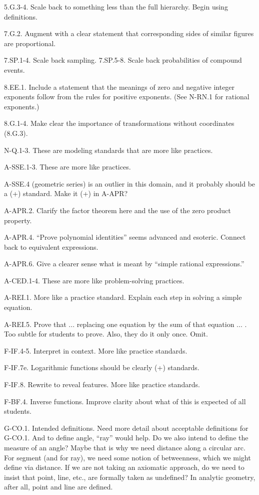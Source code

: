 
5.G.3-4.  Scale back to something less than the full hierarchy.  Begin using definitions. 

7.G.2.  Augment with a clear statement that corresponding sides of similar figures are proportional.  

7.SP.1-4.  Scale back sampling.  
7.SP.5-8.  Scale back probabilities of compound events.  

8.EE.1.  Include a statement that the meanings of zero and negative integer exponents follow from the rules for positive exponents.  (See N-RN.1 for rational exponents.)  

8.G.1-4.  Make clear the importance of transformations without coordinates (8.G.3). 

N-Q.1-3.  These are modeling standards that are more like practices.  

A-SSE.1-3.  These are more like practices.  

A-SSE.4 (geometric series) is an outlier in this domain, and it probably should be a (+) standard.  Make it (+) in A-APR?  

A-APR.2.  Clarify the factor theorem here and the use of the zero product property.  

A-APR.4.  ``Prove polynomial identities'' seems advanced and esoteric.  Connect back to equivalent expressions.  

A-APR.6.  Give a clearer sense what is meant by ``simple rational expressions.''

A-CED.1-4.  These are more like problem-solving practices. 

A-REI.1.  More like a practice standard.  Explain each step in solving a simple equation.  

A-REI.5.  Prove that ... replacing one equation by the sum of that equation ... .   Too subtle for students to prove.  Also, they do it only once.  Omit.  

F-IF.4-5.  Interpret in context.  More like practice standards.  

F-IF.7e.  Logarithmic functions should be clearly (+) standards.  

F-IF.8.  Rewrite to reveal features.  More like practice standards. 

F-BF.4.  Inverse functions.  Improve clarity about what of this is expected of all students.  

G-CO.1.  Intended definitions.  Need more detail about acceptable definitions for G-CO.1.  And to define angle, “ray” would help.  Do we also intend to define the measure of an angle?  Maybe that is why we need distance along a circular arc.  For segment (and for ray), we need some notion of betweenness, which we might define via distance.  If we are not taking an axiomatic approach, do we need to insist that point, line, etc., are formally taken as undefined?  In analytic geometry, after all, point and line are defined.

